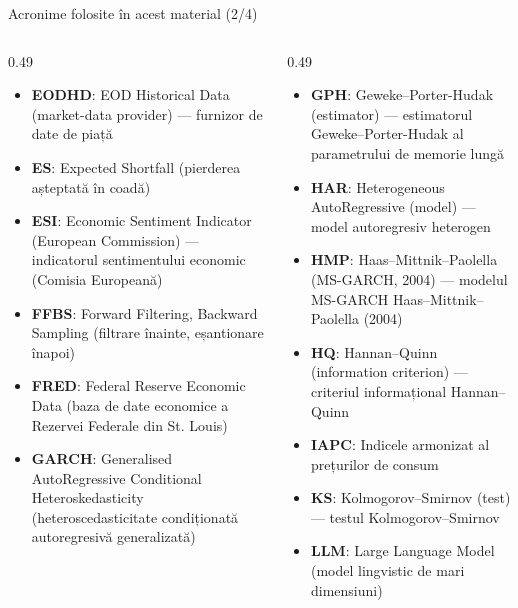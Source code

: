 \begin{frame}{Acronime folosite în acest material (2/4)}
\begin{columns}[T]
\begin{column}{0.49\textwidth}
\begin{itemize}\setlength{\itemsep}{0pt}
    \item \textbf{EODHD}: EOD Historical Data (market-data provider) — furnizor de date de piață
    \item \textbf{ES}: Expected Shortfall (pierderea așteptată în coadă)
    \item \textbf{ESI}: Economic Sentiment Indicator (European Commission) — indicatorul sentimentului economic (Comisia Europeană)
    \item \textbf{FFBS}: Forward Filtering, Backward Sampling (filtrare înainte, eșantionare înapoi)
    \item \textbf{FRED}: Federal Reserve Economic Data (baza de date economice a Rezervei Federale din St. Louis)
    \item \textbf{GARCH}: Generalised AutoRegressive Conditional Heteroskedasticity (heteroscedasticitate condiționată autoregresivă generalizată)
\end{itemize}
\end{column}
\begin{column}{0.49\textwidth}
\begin{itemize}\setlength{\itemsep}{0pt}
    \item \textbf{GPH}: Geweke–Porter-Hudak (estimator) — estimatorul Geweke–Porter-Hudak al parametrului de memorie lungă
    \item \textbf{HAR}: Heterogeneous AutoRegressive (model) — model autoregresiv heterogen
    \item \textbf{HMP}: Haas–Mittnik–Paolella (MS-GARCH, 2004) — modelul MS-GARCH Haas–Mittnik–Paolella (2004)
    \item \textbf{HQ}: Hannan–Quinn (information criterion) — criteriul informațional Hannan–Quinn
    \item \textbf{IAPC}: Indicele armonizat al prețurilor de consum
    \item \textbf{KS}: Kolmogorov–Smirnov (test) — testul Kolmogorov–Smirnov
    \item \textbf{LLM}: Large Language Model (model lingvistic de mari dimensiuni)
\end{itemize}
\end{column}
\end{columns}
\end{frame}
